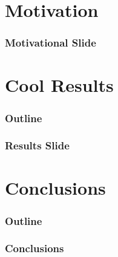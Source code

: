 \documentclass{beamer}
\begin{document}
\section{Motivation} %


\begin{frame}
	\frametitle{Motivational Slide}
\end{frame}

\section{Cool Results} %


\begin{frame}
	\frametitle{Outline}
	\tableofcontents[currentsection]
\end{frame}

\begin{frame}
	\frametitle{Results Slide}
\end{frame}


\section{Conclusions}  %

\begin{frame}
	\frametitle{Outline}
	\tableofcontents[currentsection]
\end{frame}

\begin{frame}
	\frametitle{Conclusions}
\end{frame}
\end{document}
